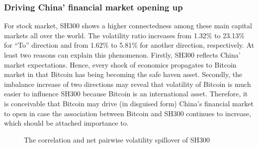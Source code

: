 \documentclass[review]{elsarticle}
\begin{document}
\subsubsection{Driving China' financial market opening up}
For stock market, SH300 shows a higher connectedness among these main capital markets all over the world. The volatility ratio increases from 1.32\% to 23.13\% for ``To'' direction and from 1.62\% to 5.81\% for another direction, respectively. At least two reasons can explain this phenomenon. Firstly, SH300 reflects China' market expectations. Hence, every shock of economics propagates to Bitcoin market in that Bitcoin has being becoming the safe haven asset.  Secondly, the imbalance increase of two directions may reveal that volatility of Bitcoin is much easier to influence SH300 because Bitcoin is an international asset. Therefore, it is conceivable that Bitcoin may drive (in disguised form) China's financial market to open in case the association between Bitcoin and SH300 continues to increase, which should be attached importance to.

\begin{figure}[H]
	\centering  %
	
	
	\caption{The correlation and net pairwise volatility spillover of SH300}
	\label{SH300.main}
\end{figure}
\end{document}
